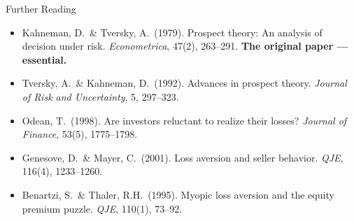 \documentclass[aspectratio=169]{beamer}
\begin{document}
\begin{frame}{Further Reading}
\begin{itemize}
  \item Kahneman, D.\ \& Tversky, A.\ (1979). Prospect theory: An analysis of decision under risk. \textit{Econometrica}, 47(2), 263--291. \textcolor{bepurple}{\textbf{The original paper --- essential.}}
  \item Tversky, A.\ \& Kahneman, D.\ (1992). Advances in prospect theory. \textit{Journal of Risk and Uncertainty}, 5, 297--323.
  \item Odean, T.\ (1998). Are investors reluctant to realize their losses? \textit{Journal of Finance}, 53(5), 1775--1798.
  \item Genesove, D.\ \& Mayer, C.\ (2001). Loss aversion and seller behavior. \textit{QJE}, 116(4), 1233--1260.
  \item Benartzi, S.\ \& Thaler, R.H.\ (1995). Myopic loss aversion and the equity premium puzzle. \textit{QJE}, 110(1), 73--92.
\end{itemize}
\end{frame}
\end{document}
